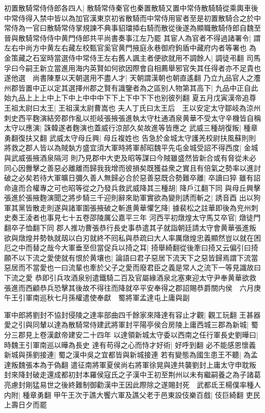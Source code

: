 初置散騎常侍侍郎各四人|{
	散騎常侍秦官也秦置散騎又置中常侍散騎騎從乘輿車後中常侍得入禁中皆以為加官漢東京初省散騎而中常侍用宦者至是初置散騎合之於中常侍為一官曰散騎常侍掌規諫不典事貂璫揷右騎而散從後遂為顯職散騎侍郎自魏至晉與散騎常侍侍中黄門侍郎共平尚書奏事江左乃罷}
其宦人為官者不得過諸署令|{
	謂左右中尚方中黄左右藏左校甄官奚官黄門掖庭永巷御府鉤盾中藏府内者等署也}
為金策藏之石室時當選侍中常侍王左右舊人諷主者便欲就用不調餘人|{
	調徒弔翻}
司馬孚曰今嗣王新立當進用海内英賢如何欲因際會自相薦舉邪官失其任得者亦不足貴也遂他選　尚書陳羣以天朝選用不盡人才|{
	天朝謂漢朝也朝直遙翻}
乃立九品官人之灋州郡皆置中正以定其選擇州郡之賢有識鑒者為之區别人物第其高下|{
	九品中正自此始九品上上上中上下中上中中中下下上下中下下也别彼列翻}
夏五月戊寅漢帝追尊王祖太尉曰太王|{
	王祖漢太尉曹嵩也}
夫人丁氏曰太王后　王以安定太守鄒岐為涼州刺史西平麴演結旁郡作亂以拒岐張掖張進執太守杜通酒泉黄華不受太守辛機皆自稱太守以應演|{
	誅韓遂者麴演也蓋威行涼部久矣故進等皆應之}
武威三種胡復叛|{
	種章勇翻復扶又翻}
武威太守母丘興|{
	母丘複姓也}
告急於金城太守護羌校尉扶風蘇則則將救之郡人皆以為賊埶方盛宜須大軍時將軍郝昭魏平先屯金城受詔不得西度|{
	金城與武威張掖酒泉隔河}
則乃見郡中大吏及昭等謀曰今賊雖盛然皆新合或有脅從未必同心因釁擊之善惡必離離而歸我我增而彼損矣既獲益衆之實且有倍氣之勢率以進討破之必矣若待大軍曠日彌久善人無歸必合於惡善惡既合勢難卒離|{
	卒讀曰猝}
雖有詔命違而合權專之可也昭等從之乃發兵救武威降其三種胡|{
	降戶江翻下同}
與母丘興擊張進於張掖麴演聞之將步騎三千迎則辭來助軍實欲為變則誘而斬之|{
	誘音酉}
出以狗軍其黨皆散走則遂與諸軍圍張掖破之斬進黄華懼乞降|{
	據裴松之註華即後為兖州刺史奏王淩者也事見七十五卷邵陵厲公嘉平三年}
河西平初燉煌太守馬艾卒官|{
	燉徒門翻卒子恤翻下同}
郡人推功曹張恭行長史事恭遣其子就詣朝廷請太守會黄華張進叛欲與燉煌并勢執就刼以白刃就終不囘私與恭疏曰大人率厲燉煌忠義顯然豈以就在困厄之中而替之哉今大軍垂至但當促兵以掎之耳|{
	掎舉綺翻從後牽曰掎又云偏引曰掎}
願不以下流之愛使就有恨於黄壤也|{
	論語曰君子惡居下流天下之惡皆歸焉謂下流當惡居而不當愛也一曰流輩也牽於父子之愛而廢君臣之義是常人之流下一等見識故曰下流之愛}
恭即引兵攻酒泉别遣鐵騎二百及官屬緣酒泉北塞東迎太守尹奉黄華欲救張進而西顧恭兵恐擊其後故不得往而降就卒平安奉得之郡詔賜恭爵關内侯　六月庚午王引軍南巡秋七月孫權遣使奉獻　蜀將軍孟達屯上庸與副

軍中郎將劉封不協封侵陵之達率部曲四千餘家來降達有容止才觀|{
	觀工玩翻}
王甚器愛之引與同輦以達為散騎常侍建武將軍封平陽亭侯合房陵上庸西城三郡為新城|{
	蜀分三郡見上卷漢獻帝建安二十四年}
以達領新城太守委以西南之任行軍長史劉曄曰|{
	時魏王引軍南巡以曄為長史}
達有苟得之心而恃才好術|{
	好呼到翻}
必不能感恩懷義新城與孫劉接連|{
	蜀之漢中吳之宜都皆與新城接連}
若有變態為國生患王不聽|{
	為孟達叛魏張本為于偽翻}
遣征南將軍夏侯尚右將軍徐晃與達共襲劉封上庸太守申耽叛封來降封破走還成都初封本羅侯寇氏之子漢中王初至荆州以未有繼嗣養之為子諸葛亮慮封剛猛易世之後終難制御勸漢中王因此際除之遂賜封死　武都氐王楊僕率種人内附|{
	種章勇翻}
甲午王次于譙大饗六軍及譙父老于邑東設伎樂百戲|{
	伎巨綺翻}
吏民上壽日夕而罷

